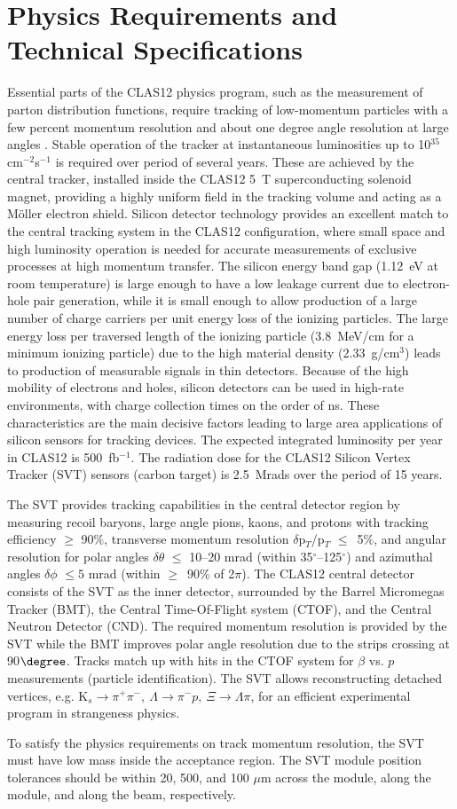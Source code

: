 \section{Physics Requirements and Technical Specifications}
Essential parts of the CLAS12 physics program, such as the measurement of parton distribution functions, require tracking of low-momentum  particles with a few percent momentum resolution and about one degree angle resolution at large angles \cite{TDR12}. Stable operation of the tracker at instantaneous luminosities up to 10$^{35}~$cm$^{-2}$s$^{-1}$ is required over period of several years. These are achieved by the central tracker, installed inside the CLAS12 5~T superconducting solenoid magnet,  providing a highly uniform field in the tracking volume and acting as a M\"oller electron shield. Silicon detector technology provides an excellent match to the central tracking system in the CLAS12 configuration, where small space and high luminosity operation is needed for accurate measurements of exclusive processes at high momentum transfer. The silicon energy band gap (1.12~eV at room temperature) is large enough to have a low leakage current due to electron-hole pair generation, while it is small enough to allow production of a large number of charge carriers per unit energy loss of the ionizing particles. The large energy loss per traversed length of the ionizing particle (3.8~MeV/cm for a minimum ionizing particle) due to the high material density (2.33~g/cm$^3$) leads to production of  measurable signals in thin detectors. Because of the high mobility of electrons and holes, silicon detectors can be used in high-rate environments, with charge collection times on the order of ns. These characteristics are the main decisive factors leading to large area applications of silicon sensors for tracking devices. The expected integrated luminosity per year in CLAS12 is 500~fb$^{-1}$. The radiation dose for the CLAS12 Silicon Vertex Tracker (SVT) sensors (carbon target) is 2.5~Mrads over the period of 15 years.

The SVT provides tracking capabilities in the central detector region by measuring recoil baryons, large angle pions,  kaons, and protons with tracking efficiency $\ge$ 90$\%$, transverse momentum resolution $\delta$p$_{T}$/p$_{T}$ $\le$~5$\%$, and angular resolution for polar angles $\delta$$\theta$ $\le$ 10--20 mrad (within 35$^\circ$--125$^\circ$) and azimuthal angles $\delta$$\phi$ $\le5$ mrad (within $\ge$~90$\%$ of 2$\pi$). The CLAS12 central detector consists of the SVT as the inner detector, surrounded by the Barrel Micromegas Tracker (BMT), the Central Time-Of-Flight system (CTOF), and the Central Neutron Detector (CND). The required momentum resolution is provided by the SVT while the BMT improves polar angle resolution due to the strips crossing at 90$\degree$. Tracks match up with hits in the CTOF system for $\beta$ vs. $p$ measurements (particle identification). The SVT allows reconstructing detached vertices, e.g. K$_{s}\!\to\!\pi^{+}\pi^{-},~\Lambda\!\to\!\pi^{-}p,~\Xi\!\to\!\Lambda\pi$, for an efficient experimental program in strangeness physics.  

To satisfy the physics requirements on track momentum resolution, the SVT must have low mass inside the acceptance region. The SVT module position tolerances should be within 20, 500, and 100 $\mu$m across the module, along the module, and along the beam, respectively.
